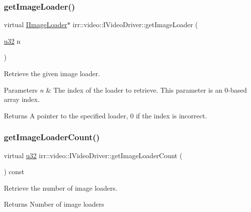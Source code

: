 \subsubsection{\texorpdfstring{get\+Image\+Loader()}{getImageLoader()}}
{\footnotesize\ttfamily virtual \hyperlink{classirr_1_1video_1_1IImageLoader}{I\+Image\+Loader}$\ast$ irr\+::video\+::\+I\+Video\+Driver\+::get\+Image\+Loader (\begin{DoxyParamCaption}\item[{\hyperlink{namespaceirr_a0416a53257075833e7002efd0a18e804}{u32}}]{n }\end{DoxyParamCaption})\hspace{0.3cm}{\ttfamily [pure virtual]}}



Retrieve the given image loader. 


\begin{DoxyParams}{Parameters}
{\em n} & The index of the loader to retrieve. This parameter is an 0-\/based array index. \\
\hline
\end{DoxyParams}
\begin{DoxyReturn}{Returns}
A pointer to the specified loader, 0 if the index is incorrect. 
\end{DoxyReturn}
\mbox{\label{classirr_1_1video_1_1IVideoDriver_a92535921ad01c90570533ba60b0b76b2}} 
\subsubsection{\texorpdfstring{get\+Image\+Loader\+Count()}{getImageLoaderCount()}}
{\footnotesize\ttfamily virtual \hyperlink{namespaceirr_a0416a53257075833e7002efd0a18e804}{u32} irr\+::video\+::\+I\+Video\+Driver\+::get\+Image\+Loader\+Count (\begin{DoxyParamCaption}{ }\end{DoxyParamCaption}) const\hspace{0.3cm}{\ttfamily [pure virtual]}}



Retrieve the number of image loaders. 

\begin{DoxyReturn}{Returns}
Number of image loaders 
\end{DoxyReturn}
\mbox{\label{classirr_1_1video_1_1IVideoDriver_acdc5e788993c117efebb22e155ab6a77}} 
